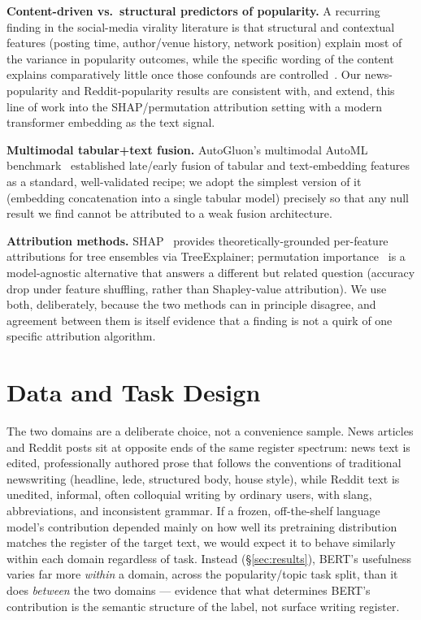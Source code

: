 \documentclass[conference]{IEEEtran}
\begin{document}
\textbf{Content-driven vs.\ structural predictors of popularity.} A recurring finding in the social-media virality literature is that structural and contextual features (posting time, author/venue history, network position) explain most of the variance in popularity outcomes, while the specific wording of the content explains comparatively little once those confounds are controlled~\cite{tan2014effect,lakkaraju2013s,gilbert2010widespread}. Our news-popularity and Reddit-popularity results are consistent with, and extend, this line of work into the SHAP/permutation attribution setting with a modern transformer embedding as the text signal.

\textbf{Multimodal tabular+text fusion.} AutoGluon's multimodal AutoML benchmark~\cite{shi2021multimodal} established late/early fusion of tabular and text-embedding features as a standard, well-validated recipe; we adopt the simplest version of it (embedding concatenation into a single tabular model) precisely so that any null result we find cannot be attributed to a weak fusion architecture.

\textbf{Attribution methods.} SHAP~\cite{lundberg2017unified} provides theoretically-grounded per-feature attributions for tree ensembles via TreeExplainer; permutation importance~\cite{breiman2001random,breiman2001permutation} is a model-agnostic alternative that answers a different but related question (accuracy drop under feature shuffling, rather than Shapley-value attribution). We use both, deliberately, because the two methods can in principle disagree, and agreement between them is itself evidence that a finding is not a quirk of one specific attribution algorithm.

\section{Data and Task Design}
\label{sec:data}

The two domains are a deliberate choice, not a convenience sample. News articles and Reddit posts sit at opposite ends of the same register spectrum: news text is edited, professionally authored prose that follows the conventions of traditional newswriting (headline, lede, structured body, house style), while Reddit text is unedited, informal, often colloquial writing by ordinary users, with slang, abbreviations, and inconsistent grammar. If a frozen, off-the-shelf language model's contribution depended mainly on how well its pretraining distribution matches the register of the target text, we would expect it to behave similarly within each domain regardless of task. Instead (\S\ref{sec:results}), BERT's usefulness varies far more \emph{within} a domain, across the popularity/topic task split, than it does \emph{between} the two domains --- evidence that what determines BERT's contribution is the semantic structure of the label, not surface writing register.
\end{document}
